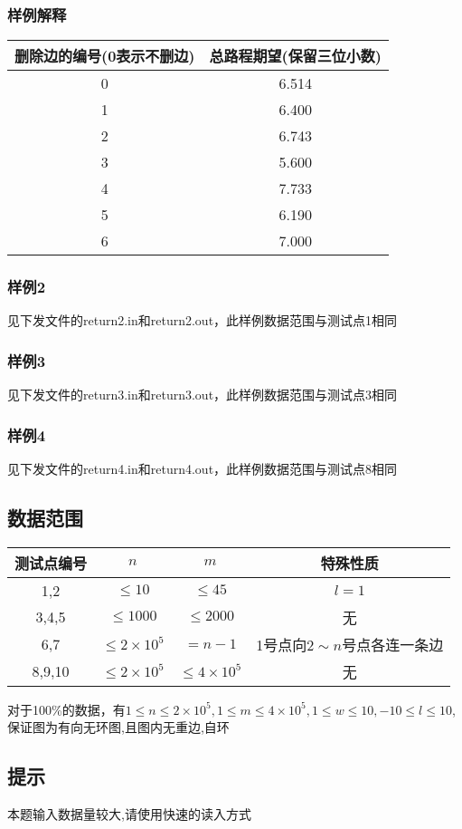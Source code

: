 \documentclass[12pt]{ctexart}
\begin{document}
\subsubsection{样例解释}
\begin{center}
	\begin{tabular}{|c|c|}
		\hline 删除边的编号(0表示不删边)&总路程期望(保留三位小数)\\
		\hline 0&6.514\\
		\hline 1&6.400\\
		\hline 2&6.743\\
		\hline 3&5.600\\
		\hline 4&7.733\\
		\hline 5&6.190\\
		\hline 6&7.000\\
		\hline
	\end{tabular}
\end{center}
\subsubsection{样例2}
见下发文件的return2.in和return2.out，此样例数据范围与测试点1相同
\subsubsection{样例3}
见下发文件的return3.in和return3.out，此样例数据范围与测试点3相同
\subsubsection{样例4}
见下发文件的return4.in和return4.out，此样例数据范围与测试点8相同
\subsection{数据范围}
\begin{center}
	\begin{tabular}{|c|c|c|c|}
		\hline 测试点编号&$n$&$m$&特殊性质\\
		\hline 1,2&$\le10$&$\le45$&$l=1$\\
		\hline 3,4,5&$\le1000$&$\le2000$&无\\
		\hline 6,7&$\le2\times10^5$&$=n-1$&1号点向$2\sim n$号点各连一条边\\
		\hline 8,9,10&$\le2\times10^5$&$\le4\times10^5$&无\\
		\hline
	\end{tabular}
\end{center}
对于100\%的数据，有$1\le n\le2\times10^5,1\le m\le4\times10^5,1\le w\le10,-10\le l\le10$,保证图为有向无环图,且图内无重边,自环
\subsection{提示}
本题输入数据量较大,请使用快速的读入方式
\end{document}

